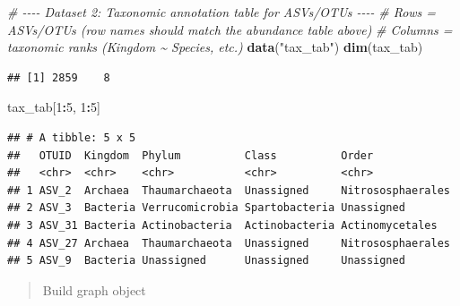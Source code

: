 \documentclass[
]{book}
\newenvironment{Shaded}{\begin{snugshade}}{\end{snugshade}}
\newcommand{\CommentTok}[1]{\textcolor[rgb]{0.56,0.35,0.01}{\textit{#1}}}
\newcommand{\DecValTok}[1]{\textcolor[rgb]{0.00,0.00,0.81}{#1}}
\newcommand{\FunctionTok}[1]{\textcolor[rgb]{0.13,0.29,0.53}{\textbf{#1}}}
\newcommand{\NormalTok}[1]{#1}
\newcommand{\SpecialCharTok}[1]{\textcolor[rgb]{0.81,0.36,0.00}{\textbf{#1}}}
\newcommand{\StringTok}[1]{\textcolor[rgb]{0.31,0.60,0.02}{#1}}
\begin{document}
\begin{Shaded}
\begin{Highlighting}[]
\CommentTok{\# {-}{-}{-}{-} Dataset 2: Taxonomic annotation table for ASVs/OTUs {-}{-}{-}{-}}
\CommentTok{\# Rows = ASVs/OTUs (row names should match the abundance table above)}
\CommentTok{\# Columns = taxonomic ranks (Kingdom \textasciitilde{} Species, etc.)}
\FunctionTok{data}\NormalTok{(}\StringTok{"tax\_tab"}\NormalTok{)}
\FunctionTok{dim}\NormalTok{(tax\_tab)}
\end{Highlighting}
\end{Shaded}

\begin{verbatim}
## [1] 2859    8
\end{verbatim}

\begin{Shaded}
\begin{Highlighting}[]
\NormalTok{tax\_tab[}\DecValTok{1}\SpecialCharTok{:}\DecValTok{5}\NormalTok{, }\DecValTok{1}\SpecialCharTok{:}\DecValTok{5}\NormalTok{]}
\end{Highlighting}
\end{Shaded}

\begin{verbatim}
## # A tibble: 5 x 5
##   OTUID  Kingdom  Phylum          Class          Order            
##   <chr>  <chr>    <chr>           <chr>          <chr>            
## 1 ASV_2  Archaea  Thaumarchaeota  Unassigned     Nitrososphaerales
## 2 ASV_3  Bacteria Verrucomicrobia Spartobacteria Unassigned       
## 3 ASV_31 Bacteria Actinobacteria  Actinobacteria Actinomycetales  
## 4 ASV_27 Archaea  Thaumarchaeota  Unassigned     Nitrososphaerales
## 5 ASV_9  Bacteria Unassigned      Unassigned     Unassigned
\end{verbatim}

\begin{quote}
Build graph object
\end{quote}
\end{document}
